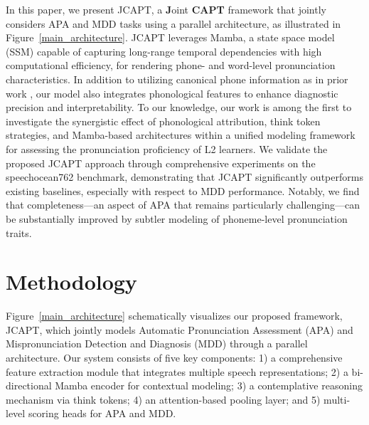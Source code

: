 \documentclass{Interspeech}
\begin{document}
In this paper, we present JCAPT, a \textbf{J}oint \textbf{CAPT} framework that jointly considers APA and MDD tasks using a parallel architecture, as illustrated in Figure~\ref{main_architecture}. JCAPT leverages Mamba, a state space model (SSM) capable of capturing long-range temporal dependencies with high computational efficiency, for rendering phone- and word-level pronunciation characteristics. In addition to utilizing canonical phone information as in prior work \cite{Gong22-MultiAspect, yan2023preserving, he2024jam}, our model also integrates phonological features to enhance diagnostic precision and interpretability. To our knowledge, our work is among the first to investigate the synergistic effect of phonological attribution, think token strategies, and Mamba-based architectures within a unified modeling framework for assessing the pronunciation proficiency of L2 learners. We validate the proposed JCAPT approach through comprehensive experiments on the speechocean762 benchmark, demonstrating that JCAPT significantly outperforms existing baselines, especially with respect to MDD performance. Notably, we find that completeness—an aspect of APA that remains particularly challenging—can be substantially improved by subtler modeling of phoneme-level pronunciation traits.



\section{Methodology}
Figure~\ref{main_architecture} schematically visualizes our proposed framework, JCAPT, which jointly models Automatic Pronunciation Assessment (APA) and Mispronunciation Detection and Diagnosis (MDD) through a parallel architecture. Our system consists of five key components: 
1) a comprehensive feature extraction module that integrates multiple speech representations; 
2) a bi-directional Mamba encoder for contextual modeling; 
3) a contemplative reasoning mechanism via think tokens; 
4) an attention-based pooling layer; 
and 5) multi-level scoring heads for APA and MDD. 
\end{document}
